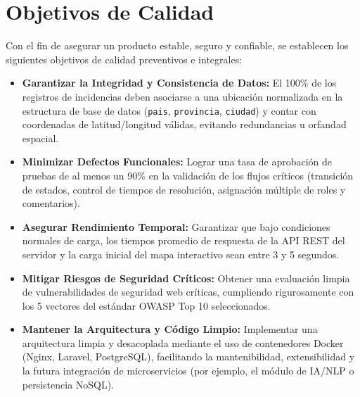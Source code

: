 \section{Objetivos de Calidad}
Con el fin de asegurar un producto estable, seguro y confiable, se establecen los siguientes objetivos de calidad preventivos e integrales:

\begin{itemize}
    \item
  \textbf{Garantizar la Integridad y Consistencia de Datos:} El 100\% de
  los registros de incidencias deben asociarse a una ubicación
  normalizada en la estructura de base de datos (\texttt{pais},
  \texttt{provincia}, \texttt{ciudad}) y contar con coordenadas de
  latitud/longitud válidas, evitando redundancias u orfandad espacial.
\item
  \textbf{Minimizar Defectos Funcionales:} Lograr una tasa de aprobación
  de pruebas de al menos un 90\% en la validación de los flujos críticos
  (transición de estados, control de tiempos de resolución, asignación
  múltiple de roles y comentarios).
\item
  \textbf{Asegurar Rendimiento Temporal:} Garantizar que bajo
  condiciones normales de carga, los tiempos promedio de respuesta de la
  API REST del servidor y la carga inicial del mapa interactivo sean
  entre 3 y 5 segundos.
\item
  \textbf{Mitigar Riesgos de Seguridad Críticos:} Obtener una evaluación
  limpia de vulnerabilidades de seguridad web críticas, cumpliendo
  rigurosamente con los 5 vectores del estándar OWASP Top 10
  seleccionados.
\item
  \textbf{Mantener la Arquitectura y Código Limpio:} Implementar una
  arquitectura limpia y desacoplada mediante el uso de contenedores
  Docker (Nginx, Laravel, PostgreSQL), facilitando la mantenibilidad,
  extensibilidad y la futura integración de microservicios (por ejemplo,
  el módulo de IA/NLP o persistencia NoSQL).
\end{itemize}
